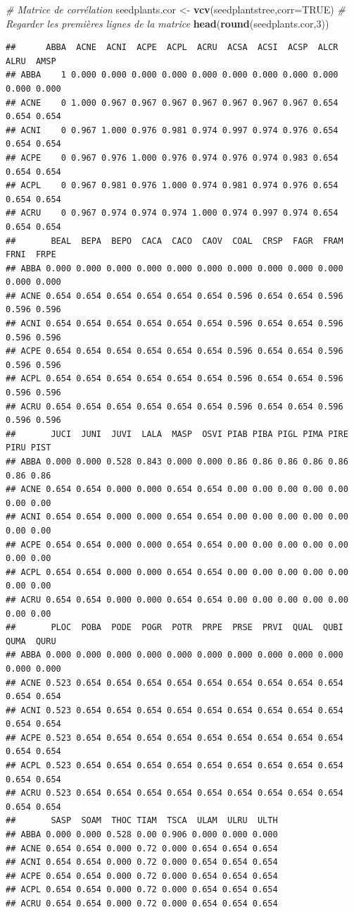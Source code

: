 \documentclass[
]{book}
\newenvironment{Shaded}{\begin{snugshade}}{\end{snugshade}}
\newcommand{\AttributeTok}[1]{\textcolor[rgb]{0.13,0.29,0.53}{#1}}
\newcommand{\CommentTok}[1]{\textcolor[rgb]{0.56,0.35,0.01}{\textit{#1}}}
\newcommand{\ConstantTok}[1]{\textcolor[rgb]{0.56,0.35,0.01}{#1}}
\newcommand{\DecValTok}[1]{\textcolor[rgb]{0.00,0.00,0.81}{#1}}
\newcommand{\FunctionTok}[1]{\textcolor[rgb]{0.13,0.29,0.53}{\textbf{#1}}}
\newcommand{\NormalTok}[1]{#1}
\newcommand{\OtherTok}[1]{\textcolor[rgb]{0.56,0.35,0.01}{#1}}
\begin{document}
\begin{Shaded}
\begin{Highlighting}[]
\CommentTok{\# Matrice de corrélation}
\NormalTok{seedplants.cor }\OtherTok{\textless{}{-}} \FunctionTok{vcv}\NormalTok{(seedplantstree,}\AttributeTok{corr=}\ConstantTok{TRUE}\NormalTok{)}
\CommentTok{\# Regarder les premières lignes de la matrice}
\FunctionTok{head}\NormalTok{(}\FunctionTok{round}\NormalTok{(seedplants.cor,}\DecValTok{3}\NormalTok{))}
\end{Highlighting}
\end{Shaded}

\begin{verbatim}
##      ABBA  ACNE  ACNI  ACPE  ACPL  ACRU  ACSA  ACSI  ACSP  ALCR  ALRU  AMSP
## ABBA    1 0.000 0.000 0.000 0.000 0.000 0.000 0.000 0.000 0.000 0.000 0.000
## ACNE    0 1.000 0.967 0.967 0.967 0.967 0.967 0.967 0.967 0.654 0.654 0.654
## ACNI    0 0.967 1.000 0.976 0.981 0.974 0.997 0.974 0.976 0.654 0.654 0.654
## ACPE    0 0.967 0.976 1.000 0.976 0.974 0.976 0.974 0.983 0.654 0.654 0.654
## ACPL    0 0.967 0.981 0.976 1.000 0.974 0.981 0.974 0.976 0.654 0.654 0.654
## ACRU    0 0.967 0.974 0.974 0.974 1.000 0.974 0.997 0.974 0.654 0.654 0.654
##       BEAL  BEPA  BEPO  CACA  CACO  CAOV  COAL  CRSP  FAGR  FRAM  FRNI  FRPE
## ABBA 0.000 0.000 0.000 0.000 0.000 0.000 0.000 0.000 0.000 0.000 0.000 0.000
## ACNE 0.654 0.654 0.654 0.654 0.654 0.654 0.596 0.654 0.654 0.596 0.596 0.596
## ACNI 0.654 0.654 0.654 0.654 0.654 0.654 0.596 0.654 0.654 0.596 0.596 0.596
## ACPE 0.654 0.654 0.654 0.654 0.654 0.654 0.596 0.654 0.654 0.596 0.596 0.596
## ACPL 0.654 0.654 0.654 0.654 0.654 0.654 0.596 0.654 0.654 0.596 0.596 0.596
## ACRU 0.654 0.654 0.654 0.654 0.654 0.654 0.596 0.654 0.654 0.596 0.596 0.596
##       JUCI  JUNI  JUVI  LALA  MASP  OSVI PIAB PIBA PIGL PIMA PIRE PIRU PIST
## ABBA 0.000 0.000 0.528 0.843 0.000 0.000 0.86 0.86 0.86 0.86 0.86 0.86 0.86
## ACNE 0.654 0.654 0.000 0.000 0.654 0.654 0.00 0.00 0.00 0.00 0.00 0.00 0.00
## ACNI 0.654 0.654 0.000 0.000 0.654 0.654 0.00 0.00 0.00 0.00 0.00 0.00 0.00
## ACPE 0.654 0.654 0.000 0.000 0.654 0.654 0.00 0.00 0.00 0.00 0.00 0.00 0.00
## ACPL 0.654 0.654 0.000 0.000 0.654 0.654 0.00 0.00 0.00 0.00 0.00 0.00 0.00
## ACRU 0.654 0.654 0.000 0.000 0.654 0.654 0.00 0.00 0.00 0.00 0.00 0.00 0.00
##       PLOC  POBA  PODE  POGR  POTR  PRPE  PRSE  PRVI  QUAL  QUBI  QUMA  QURU
## ABBA 0.000 0.000 0.000 0.000 0.000 0.000 0.000 0.000 0.000 0.000 0.000 0.000
## ACNE 0.523 0.654 0.654 0.654 0.654 0.654 0.654 0.654 0.654 0.654 0.654 0.654
## ACNI 0.523 0.654 0.654 0.654 0.654 0.654 0.654 0.654 0.654 0.654 0.654 0.654
## ACPE 0.523 0.654 0.654 0.654 0.654 0.654 0.654 0.654 0.654 0.654 0.654 0.654
## ACPL 0.523 0.654 0.654 0.654 0.654 0.654 0.654 0.654 0.654 0.654 0.654 0.654
## ACRU 0.523 0.654 0.654 0.654 0.654 0.654 0.654 0.654 0.654 0.654 0.654 0.654
##       SASP  SOAM  THOC TIAM  TSCA  ULAM  ULRU  ULTH
## ABBA 0.000 0.000 0.528 0.00 0.906 0.000 0.000 0.000
## ACNE 0.654 0.654 0.000 0.72 0.000 0.654 0.654 0.654
## ACNI 0.654 0.654 0.000 0.72 0.000 0.654 0.654 0.654
## ACPE 0.654 0.654 0.000 0.72 0.000 0.654 0.654 0.654
## ACPL 0.654 0.654 0.000 0.72 0.000 0.654 0.654 0.654
## ACRU 0.654 0.654 0.000 0.72 0.000 0.654 0.654 0.654
\end{verbatim}
\end{document}
